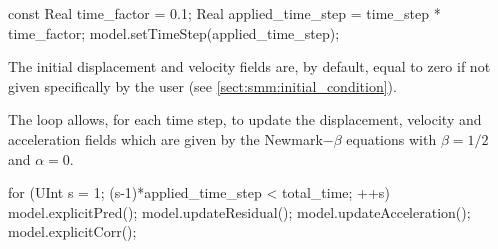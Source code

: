 \documentclass[a4paper,11pt]{book}
\begin{document}
\begin{cpp}
  const Real time_factor = 0.1;
  Real applied_time_step = time_step * time_factor;
  model.setTimeStep(applied_time_step);
\end{cpp}

The initial displacement  and velocity fields are, by default,  equal to zero if
not given specifically by the user (see \ref{sect:smm:initial_condition}).

The loop  allows, for each time  step, to update the  displacement, velocity and
acceleration  fields  which are  given  by  the  Newmark$-\beta$ equations  with
$\beta=1/2$ and $\alpha=0$.

\begin{cpp}
  for (UInt s = 1; (s-1)*applied_time_step < total_time; ++s) {
    model.explicitPred();
    model.updateResidual();
    model.updateAcceleration();
    model.explicitCorr();
  }
\end{cpp}
\end{document}
